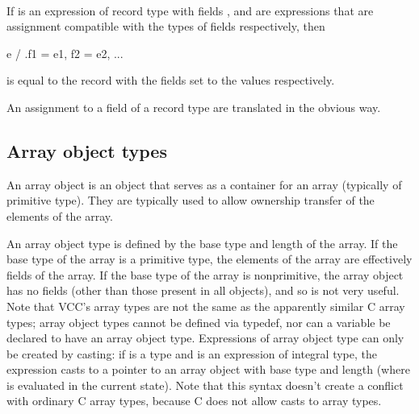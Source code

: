 \documentclass[preprint,nocopyrightspace]{sigplanconf}
\begin{document}
{{{{\\
If  is an expression of record type with
fields , and  are expressions that are
assignment compatible with the types of fields 
respectively, then
\begin{VCC}
  e / { .f1 = e1, f2 = e2, ...}
\end{VCC}
is equal to the record  with the fields  set
to the values  respectively.

An assignment to a field of a record type are translated in the
obvious way.


\subsection{Array object types}
An array object is an object that serves as a container for an array
(typically of primitive type). They are typically used to allow
ownership transfer of the elements of the array.

An array  object type is  defined by the  base type and length  of the
array. If the base type of the array is a primitive type, the elements
of the array are effectively fields  of the array. If the base type of
the array is nonprimitive, the  array object has no fields (other than
those present  in all objects), and  so is not very  useful. Note that
VCC's array types  are not the same as the  apparently similar C array
types; array  object types  cannot be defined  via typedef, nor  can a
variable  be declared  to have  an array  object type.  Expressions of
array object type can only be created by casting: if  is a type
and       is    an   expression    of   integral    type,   the
expression    casts   to  a pointer  to an  array
object with  base type   and length   (where   is
evaluated in the current state).  Note that this syntax doesn't create
a conflict with ordinary C array types, because C does not allow casts
to array types.

}}}}
\end{document}
